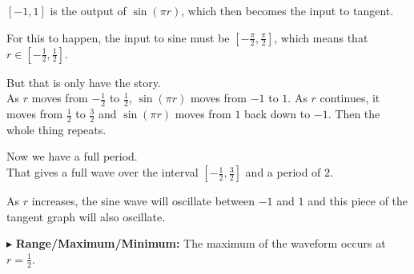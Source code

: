\documentclass{ximera}
\begin{document}
$[-1,1]$ is the output of $\sin(\pi r)$, which then becomes the input to tangent.  




For this to happen, the input to sine must be $\left[-\frac{\pi}{2}, \frac{\pi}{2}\right]$, which means that $r \in \left[-\frac{1}{2}, \frac{1}{2}\right]$.


But that is only have the story. \\


As $r$ moves from $-\frac{1}{2}$ to $\frac{1}{2}$, $\sin(\pi r)$ moves from $-1$ to $1$.  As $r$ continues, it moves from $\frac{1}{2}$ to $\frac{3}{2}$ and $\sin(\pi r)$ moves from $1$ back down to $-1$.  Then the whole thing repeats.

Now we have a full period. \\



That gives a full wave over the interval $\left[-\frac{1}{2}, \frac{3}{2}\right]$ and a period of $2$.



As $r$ increases, the sine wave will oscillate between $-1$ and $1$ and this piece of the tangent graph will also oscillate.  






\begin{image}
\end{image}




$\blacktriangleright$ \textbf{Range/Maximum/Minimum:} The maximum of the waveform occurs at $r = \frac{1}{2}$.
\end{document}
